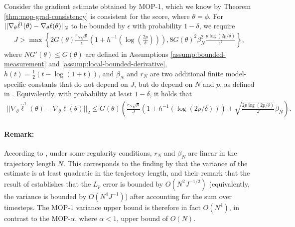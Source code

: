 \begin{lem}
    \label{lemma:grad_bound}
    Consider the gradient estimate obtained by MOP-1, which we know by Theorem \ref{thm:mop-grad-consistency} is consistent for the score, where $\theta = \phi$. For $||\nabla_\theta \hat{\ell}^1(\theta) - \nabla_\theta \ell(\theta)||_2$ to be bounded by $\epsilon$ with probability $1-\delta$, we require
    \begin{align}
    J > \max\left\{2G(\theta)\frac{r_N\sqrt{p}}{\epsilon}\left(1+h^{-1}\left(\log\left(\frac{2p}{\delta}\right)\right)\right), 8G(\theta)^2\beta_N^2\frac{p\log(2p/\delta)}{\epsilon^2}\right\},
    \end{align}
    where $NG'(\theta) \leq G(\theta)$ are defined in Assumptions \ref{assump:bounded-measurement} and \ref{assump:local-bounded-derivative}, $h(t) = \frac{1}{2}(t - \log(1+t))$, and $\beta_N$ and $r_N$ are two additional finite model-specific constants that do not depend on $J$, but do depend on $N$ and $p$, as defined in \cite{delMoral11}. 
Equivalently, with probability at least $1-\delta$, it holds that
    \begin{align}
        ||\nabla_\theta \hat\ell^1(\theta) - \nabla_\theta \ell(\theta)||_2 \leq G(\theta)\left(\frac{r_N\sqrt{p}}{J}(1+h^{-1}(\log(2p/\delta))) + \sqrt{\frac{2p\log(2p/\delta)}{J}}\beta_N\right).
    \end{align}
\end{lem}

\paragraph{Remark:} According to \cite{delMoral11}, under some regularity conditions, $r_N$ and $\beta_N$ are linear in the trajectory length $N$. This corresponds to the finding by \cite{poyiadjis11} that the variance of the estimate is at least quadratic in the trajectory length, and their remark that the result of \cite{delMoral03} establishes that the $L_p$ error is bounded by $O(N^2J^{-1/2})$ (equivalently, the variance is bounded by $O(N^4J^{-1})$) after accounting for the sum over timesteps. The MOP-$1$ variance upper bound is therefore in fact $O(N^4)$, in contrast to the MOP-$\alpha$, where $\alpha<1$, upper bound of $O(N)$. 



